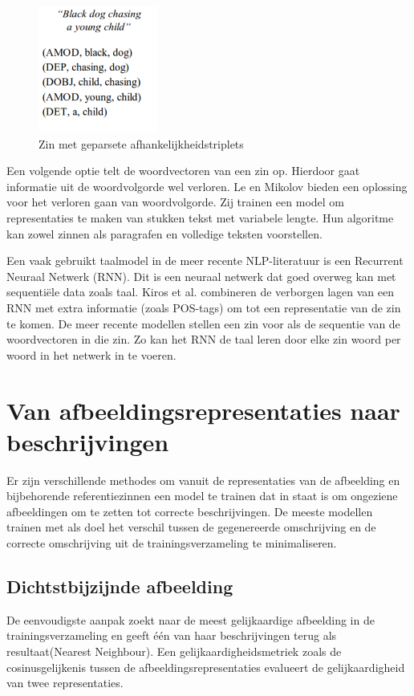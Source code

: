 \begin{figure}[tb]
     \centering
     \includegraphics[width=0.35\textwidth]{Images/dep_relations}
     \caption{Zin met geparsete afhankelijkheidstriplets\cite{Karpathy2014}}
     \label{fig:deprelations}
 \end{figure}

 Een volgende optie telt de woordvectoren van een zin op\cite{Lebret2013}. Hierdoor gaat informatie uit de woordvolgorde wel verloren. Le en Mikolov\cite{Le2014a} bieden een oplossing voor het verloren gaan van woordvolgorde. Zij trainen een model om representaties te maken van stukken tekst met variabele lengte. Hun algoritme kan zowel zinnen als paragrafen en volledige teksten voorstellen.

 Een vaak gebruikt taalmodel in de meer recente NLP-literatuur is een Recurrent Neuraal Netwerk (RNN)\cite{Mikolov2010}. Dit is een neuraal netwerk dat goed overweg kan met sequenti\"ele data zoals taal. Kiros et al.\cite{Kiros2013} combineren de verborgen lagen van een RNN met extra informatie (zoals POS-tags) om tot een representatie van de zin te komen. De meer recente modellen stellen een zin voor als de sequentie van de woordvectoren in die zin. Zo kan het RNN de taal leren door elke zin woord per woord in het netwerk in te voeren.
 
\section{Van afbeeldingsrepresentaties naar beschrijvingen}
Er zijn verschillende methodes om vanuit de representaties van de afbeelding en bijbehorende referentiezinnen een model te trainen dat in staat is om ongeziene afbeeldingen om te zetten tot correcte beschrijvingen. 
De meeste modellen trainen met als doel het verschil tussen de gegenereerde omschrijving en de correcte omschrijving uit de trainingsverzameling te minimaliseren.

\subsection{Dichtstbijzijnde afbeelding}
De eenvoudigste aanpak zoekt naar de meest gelijkaardige afbeelding in de trainingsverzameling en geeft \'e\'en van haar beschrijvingen terug als resultaat(Nearest Neighbour)\cite{Devlin2015a}. Een gelijkaardigheidsmetriek zoals de cosinusgelijkenis tussen de afbeeldingsrepresentaties evalueert de gelijkaardigheid van twee representaties.

